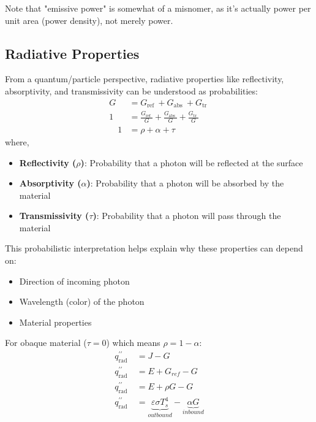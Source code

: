 Note that "emissive power" is somewhat of a misnomer, as it's actually power per unit area (power density), not merely power.

\subsection*{Radiative Properties}

From a quantum/particle perspective, radiative properties like reflectivity, absorptivity, and transmissivity can be understood as probabilities:
%
\[
    \begin{aligned}
     G &=G_{\text {ref }}+G_{\text {abs }}+G_{\text {tr }} 
    \\[0.5em]
    1 &=\frac{G_{\text {ref }}}{G}+\frac{G_{\text {abs }}}{G}+\frac{G_{\text {tr }}}{G} 
    \\[0.5em]
    \quad 1 &=\rho+\alpha+\tau
    \end{aligned}
\]
where,
\begin{itemize}
    \item \textbf{Reflectivity ($\rho$)}: Probability that a photon will be reflected at the surface
    \item \textbf{Absorptivity ($\alpha$)}: Probability that a photon will be absorbed by the material
    \item \textbf{Transmissivity ($\tau$)}: Probability that a photon will pass through the material
\end{itemize}
%
This probabilistic interpretation helps explain why these properties can depend on:
\begin{itemize}
    \item Direction of incoming photon
    \item Wavelength (color) of the photon
    \item Material properties
\end{itemize}
%
For obaque material ($\tau =0$) which means $\rho = 1- \alpha$:
\[
    \begin{aligned}
        q_{\text {rad }}^{\prime \prime} & = J - G
        \\[0.5em]
        q_{\text {rad }}^{\prime \prime} & = E + G_{ref} - G
        \\[0.5em]
        q_{\text {rad }}^{\prime \prime} & = E + \rho G - G
        \\[0.5em]
        q_{\text {rad }}^{\prime \prime} & = \underbrace{\varepsilon \sigma T_s^4}_{\textit{outbound}}- \underbrace{\alpha G}_{\textit{inbound}}
    \end{aligned}
\]
